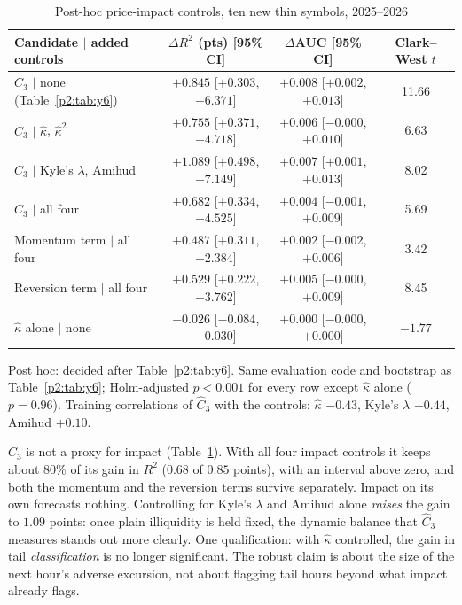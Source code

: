 \begin{table}[t]\centering\small
\begin{threeparttable}
\caption{Post-hoc price-impact controls, ten new thin symbols, 2025--2026}\label{p2:tab:y8}
\begin{tabular}{lccc}
\toprule
Candidate $\mid$ added controls & $\Delta R^2$ (pts) [95\% CI] & $\Delta$AUC [95\% CI] & Clark--West $t$\\
\midrule
$\hat C_3$ $\mid$ none (Table~\ref{p2:tab:y6}) & $+0.845$ [$+0.303$, $+6.371$] & $+0.008$ [$+0.002$, $+0.013$] & 11.66\\
$\hat C_3$ $\mid$ $\hat\kappa$, $\hat\kappa^2$ & $+0.755$ [$+0.371$, $+4.718$] & $+0.006$ [$-0.000$, $+0.010$] & 6.63\\
$\hat C_3$ $\mid$ Kyle's $\lambda$, Amihud & $+1.089$ [$+0.498$, $+7.149$] & $+0.007$ [$+0.001$, $+0.013$] & 8.02\\
$\hat C_3$ $\mid$ all four & $+0.682$ [$+0.334$, $+4.525$] & $+0.004$ [$-0.001$, $+0.009$] & 5.69\\
Momentum term $\mid$ all four & $+0.487$ [$+0.311$, $+2.384$] & $+0.002$ [$-0.002$, $+0.006$] & 3.42\\
Reversion term $\mid$ all four & $+0.529$ [$+0.222$, $+3.762$] & $+0.005$ [$-0.000$, $+0.009$] & 8.45\\
$\hat\kappa$ alone $\mid$ none & $-0.026$ [$-0.084$, $+0.030$] & $+0.000$ [$-0.000$, $+0.000$] & $-1.77$\\
\bottomrule
\end{tabular}
\begin{tablenotes}\footnotesize\item Post hoc: decided after Table~\ref{p2:tab:y6}. Same evaluation code and bootstrap as Table~\ref{p2:tab:y6}; Holm-adjusted $p<0.001$ for every row except $\hat\kappa$ alone ($p=0.96$). Training correlations of $\hat C_3$ with the controls: $\hat\kappa$ $-0.43$, Kyle's $\lambda$ $-0.44$, Amihud $+0.10$. \end{tablenotes}
\end{threeparttable}
\end{table}

$\hat C_3$ is not a proxy for impact (Table~\ref{p2:tab:y8}). With all four impact controls it keeps about 80\% of its gain in $R^2$ ($0.68$ of $0.85$ points), with an interval above zero, and both the momentum and the reversion terms survive separately. Impact on its own forecasts nothing. Controlling for Kyle's $\lambda$ and Amihud alone \emph{raises} the gain to $1.09$ points: once plain illiquidity is held fixed, the dynamic balance that $\hat C_3$ measures stands out more clearly. One qualification: with $\hat\kappa$ controlled, the gain in tail \emph{classification} is no longer significant. The robust claim is about the size of the next hour's adverse excursion, not about flagging tail hours beyond what impact already flags.

